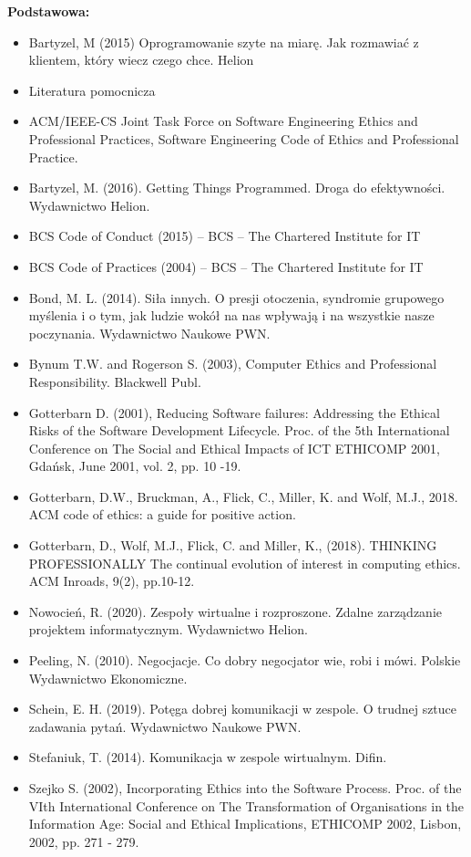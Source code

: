 \documentclass[12pt, a4paper]{article}
\begin{document}
\textbf{Podstawowa:}
\begin{itemize}
  \item Bartyzel, M (2015) Oprogramowanie szyte na miarę. Jak rozmawiać z klientem, który wiecz czego chce. Helion
  \item Literatura pomocnicza
  \item ACM/IEEE-CS Joint Task Force on Software Engineering Ethics and Professional Practices, Software Engineering Code of Ethics and Professional Practice.
  \item Bartyzel, M. (2016). Getting Things Programmed. Droga do efektywności. Wydawnictwo Helion.
  \item BCS Code of Conduct (2015) – BCS – The Chartered Institute for IT
  \item BCS Code of Practices (2004) – BCS – The Chartered Institute for IT
  \item Bond, M. L. (2014). Siła innych. O presji otoczenia, syndromie grupowego myślenia i o tym, jak ludzie wokół na nas wpływają i na wszystkie nasze poczynania. Wydawnictwo Naukowe PWN.
  \item Bynum T.W. and Rogerson S. (2003), Computer Ethics and Professional Responsibility. Blackwell Publ.
  \item Gotterbarn D. (2001), Reducing Software failures: Addressing the Ethical Risks of the Software Development Lifecycle. Proc. of the 5th International Conference on The Social and Ethical Impacts of ICT ETHICOMP 2001, Gdańsk, June 2001, vol. 2, pp. 10 -19.
  \item Gotterbarn, D.W., Bruckman, A., Flick, C., Miller, K. and Wolf, M.J., 2018. ACM code of ethics: a guide for positive action.
  \item Gotterbarn, D., Wolf, M.J., Flick, C. and Miller, K., (2018). THINKING PROFESSIONALLY The continual evolution of interest in computing ethics. ACM Inroads, 9(2), pp.10-12.
  \item Nowocień, R. (2020). Zespoły wirtualne i rozproszone. Zdalne zarządzanie projektem informatycznym.  Wydawnictwo Helion.
  \item Peeling, N. (2010). Negocjacje. Co dobry negocjator wie, robi i mówi. Polskie Wydawnictwo Ekonomiczne.
  \item Schein, E. H. (2019). Potęga dobrej komunikacji w zespole. O trudnej sztuce zadawania pytań.   Wydawnictwo Naukowe PWN.
  \item Stefaniuk, T. (2014). Komunikacja w zespole wirtualnym. Difin.
  \item Szejko S. (2002), Incorporating Ethics into the Software Process. Proc. of the VIth International Conference on The Transformation of Organisations in the Information Age: Social and Ethical Implications, ETHICOMP 2002, Lisbon, 2002, pp. 271 - 279.

\end{itemize}
\end{document}
